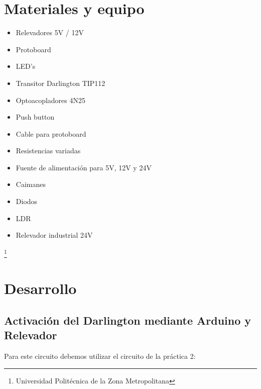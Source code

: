 \documentclass[10pt,a4paper]{article}
\begin{document}
\section{Materiales y equipo}
\begin{itemize}
\item Relevadores 5V / 12V
\item Protoboard
\item LED's 
\item Transitor Darlington TIP112
\item Optoacopladores 4N25
\item Push button
\item Cable para protoboard
\item Resistencias variadas
\item Fuente de alimentación para 5V, 12V y 24V
\item Caimanes 
\item Diodos 
\item LDR
\item Relevador industrial 24V
\end{itemize}

\footnote{Universidad Politécnica de la Zona Metropolitana}

\newpage
\section{Desarrollo}
\subsection{Activación del Darlington mediante Arduino y Relevador}
Para este circuito debemos utilizar el circuito de la práctica 2: \\
\end{document}
